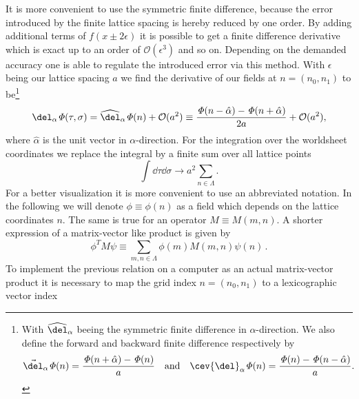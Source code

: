 It is more convenient to use the symmetric finite difference, because the error introduced by the finite lattice spacing is hereby reduced by one order.  By adding additional terms of $f(x\pm 2 \epsilon)$ it is possible to get a finite difference derivative which is exact up to an order of $\mathcal{O}(\epsilon^{3})$ and so on. Depending on the demanded accuracy one is able to regulate the introduced error via this method. With $\epsilon$ being our lattice spacing $a$ we find the derivative of our fields at $n=\left(n_{0}, n_{1} \right)$ to be\footnote{\noindent With $\widehat{\del }_{\alpha}$ beeing the symmetric finite difference in $\alpha$-direction. We also define the forward and backward finite difference respectively by
\begin{equation*}
\vec{\del}_{\alpha}\mathit{\Phi}(n)=\dfrac{\mathit{\Phi}(n+\hat{\alpha})-\mathit{\Phi}(n)}{a} \quad \text{and} \quad
\cev{\del}_{\alpha}\mathit{\Phi}(n)=\dfrac{\mathit{\Phi}(n)-\mathit{\Phi}(n-\hat{\alpha})}{a}.
\end{equation*}
}
%
%
\begin{equation}
\del_{\alpha} \mathit{\Phi}(\tau,\sigma) = \widehat{\del }_{\alpha}\mathit{\Phi}(n) + \mathcal{O}(a^{2}) \equiv \dfrac{\mathit{\Phi}(n-\hat{\alpha})-\mathit{\Phi}(n+\hat{\alpha})}{2a} + \mathcal{O}(a^{2}),
\end{equation}
where $\hat{\alpha}$ is the unit vector in $\alpha$-direction. For the integration over the worldsheet coordinates we replace the integral by a finite sum over all lattice points
\begin{equation}
\int \dd\tau \dd\sigma \longrightarrow a^{2}\sum\limits_{n \in \mathit{\Lambda}}.
\end{equation}
%
%
For a better visualization it is more convenient to use an abbreviated notation. In the following we will denote $\phi \equiv \phi(n)$ as a field which depends on the lattice coordinates $n$. The same is true for an operator $M\equiv M(m,n)$. A shorter expression of a matrix-vector like product is given by
%
%
\begin{equation}
\phi^{T}M \psi \equiv \sum\limits_{m,n \in \mathit{\Lambda}} \phi(m) M(m,n) \psi(n)\, .
\end{equation}
%
%
To implement the previous relation on a computer as an actual matrix-vector product it is necessary to map the grid index $n=(n_{0},n_{1})$ to a lexicographic vector index
